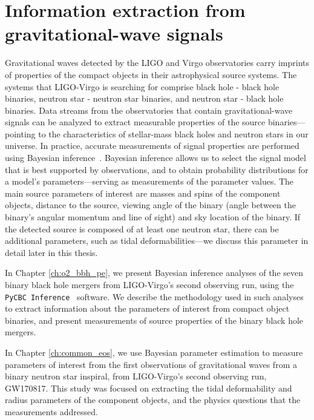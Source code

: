 \section{Information extraction from gravitational-wave signals}
Gravitational waves detected by the LIGO and Virgo observatories carry imprints of properties of the compact objects in their astrophysical source systems. The systems that LIGO-Virgo is searching for comprise black hole - black hole binaries, neutron star - neutron star binaries, and neutron star - black hole binaries. Data streams from the observatories that contain gravitational-wave signals can be analyzed to extract measurable properties of the source binaries---pointing to the characteristics of stellar-mass black holes and neutron stars in our universe. In practice, accurate measurements of signal properties are performed using Bayesian inference~\cite{Bayes:1763,Jaynes:2003jaq}. Bayesian inference allows us to select the signal model that is best supported by observations, and to obtain probability distributions for a model's parameters---serving as measurements of the parameter values. The main source parameters of interest are masses and spins of the component objects, distance to the source, viewing angle of the binary (angle between the binary's angular momentum and line of sight) and sky location of the binary. If the detected source is composed of at least one neutron star, there can be additional parameters, such as tidal deformabilities---we discuss this parameter in detail later in this thesis. 

In Chapter \ref{ch:o2_bbh_pe}, we present Bayesian inference analyses of the seven binary black hole mergers from LIGO-Virgo's second observing run, using the \texttt{PyCBC Inference}~\cite{Biwer:2018osg} software. We describe the methodology used in such analyses to extract information about the parameters of interest from compact object binaries, and present measurements of source properties of the binary black hole mergers.

In Chapter \ref{ch:common_eos}, we use Bayesian parameter estimation to measure parameters of interest from the first observations of gravitational waves from a binary neutron star inspiral, from LIGO-Virgo's second observing run, GW170817. This study was focused on extracting the tidal deformability and radius parameters of the component objects, and the physics questions that the measurements addressed. 

